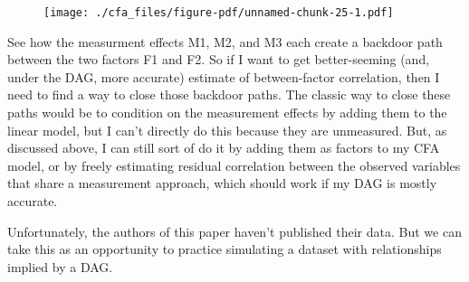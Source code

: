 \documentclass[
  letterpaper,
  DIV=11,
  numbers=noendperiod]{scrreprt}
\begin{document}
\begin{figure}[H]

{\centering \texttt{[image: ./cfa\_files/figure-pdf/unnamed-chunk-25-1.pdf]}

}

\end{figure}

See how the measurment effects M1, M2, and M3 each create a backdoor
path between the two factors F1 and F2. So if I want to get
better-seeming (and, under the DAG, more accurate) estimate of
between-factor correlation, then I need to find a way to close those
backdoor paths. The classic way to close these paths would be to
condition on the measurement effects by adding them to the linear model,
but I can't directly do this because they are unmeasured. But, as
discussed above, I can still sort of do it by adding them as factors to
my CFA model, or by freely estimating residual correlation between the
observed variables that share a measurement approach, which should work
if my DAG is mostly accurate.

Unfortunately, the authors of this paper haven't published their data.
But we can take this as an opportunity to practice simulating a dataset
with relationships implied by a DAG.
\end{document}
